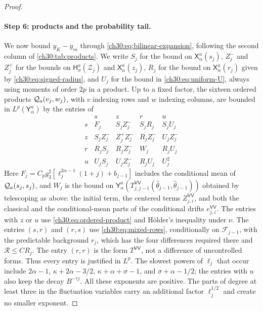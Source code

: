 \begin{proof}
\paragraph{Step 6: products and the probability tail.} We now bound $y_K-y_m$ through \eqref{ch30:eq:bilinear-expansion}, following the second column of \cref{ch30:tab:products}. We write $S_j$ for the bound on $\mathsf X_\alpha^a(s_j)$, $Z_j^-$ and $Z_j^+$ for the bounds on $\mathsf H_\sigma^a(\mathcal Z_j)$ and $\mathsf X_\alpha^a(z_j)$, $R_j$ for the bound on $\mathsf X_\alpha^a(r_j)$ given by \eqref{ch30:eq:signed-radius}, and $U_j$ for the bound in \eqref{ch30:eq:uniform-U}, always using moments of order $2p$ in a product. Up to a fixed factor, the sixteen ordered products $\mathcal Q_{a}(v_j,w_j)$, with $v$ indexing rows and $w$ indexing columns, are bounded in $L^p(\mathsf Y_\alpha^a)$ by the entries of
\[
\begin{array}{c|cccc}
 &s&z&r&u\\\hline
 s&F_j&S_jZ_j^-&S_jR_j&S_jU_j\\
 z&S_jZ_j^-&Z_j^+Z_j^-&R_jZ_j^-&U_jZ_j^-\\
 r&R_jS_j&R_jZ_j^-&W_j&R_jU_j\\
 u&U_jS_j&U_jZ_j^-&R_jU_j&U_j^2
\end{array}
\]
Here $F_j=C_pg_3^2[\ell_j^{2\alpha-1}(1+j)+b_{j-1}]$ includes the conditional mean of $\mathcal Q_{a}(s_j,s_j)$, and $W_j$ is the bound on $\mathsf Y_\alpha^a(T^{\mathsf{VV}}_{j,j-1}(\widehat\theta_{j-1},\widehat\theta_{j-1}))$ obtained by telescoping as above: the initial term, the centered terms $Z^{\mathsf{VV}}_{j,i}$, and both the classical and the conditional-mean parts of the conditional drifts $e^{\mathsf{VV}}_{j,i}$. The entries with $z$ or $u$ use \eqref{ch30:eq:ordered-product} and H\"older's inequality under $\nu$. The entries $(s,r)$ and $(r,s)$ use \eqref{ch30:eq:mixed-rows}, conditionally on $\mathcal F_{j-1}$, with the predictable background $r_j$, which has the four differences required there and $\mathcal R\le CR_j$. The entry $(r,r)$ is the form $T^{\mathsf{VV}}$, not a difference of uncontrolled forms. Thus every entry is justified in $L^p$. The slowest powers of $\ell_j$ that occur include $2\alpha-1$, $\kappa+2\alpha-3/2$, $\kappa+\alpha+\sigma-1$, and $\sigma+\alpha-1/2$; the entries with $u$ also keep the decay $B^{-\tau j}$. All these exponents are positive. The parts of degree at least three in the fluctuation variables carry an additional factor $\ell_j^{1/2}$ and create no smaller exponent.


\end{proof}
